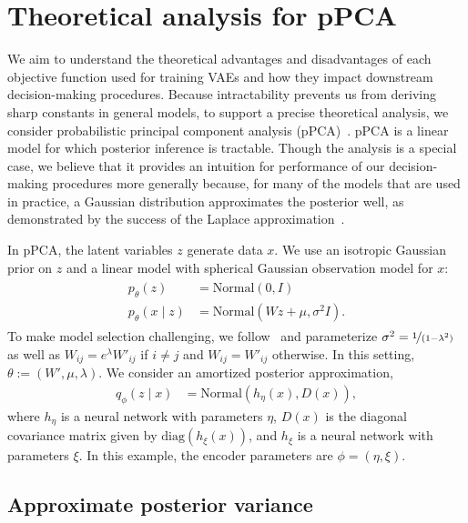 

\section{Theoretical analysis for pPCA}
\label{sec:lin_VAE_analysis}
We aim to understand the theoretical advantages and disadvantages of each objective function used for training VAEs and how they impact downstream decision-making procedures.
Because intractability prevents us from deriving sharp constants in general models, to support a precise theoretical analysis, we consider probabilistic principal component analysis (pPCA)~\cite{tipping1999probabilistic}. pPCA is a linear model for which posterior inference is tractable. 
Though the analysis is a special case, we believe that it provides an intuition for performance of our decision-making procedures more generally because, for many of the models that are used in practice, a Gaussian distribution approximates the posterior well, as demonstrated by the success of the Laplace approximation~\cite{laplace1986}.

In pPCA, the latent variables $z$ generate data $x$. We use an isotropic Gaussian prior on $z$ and a linear model with spherical Gaussian observation model for $x$:
\begin{align}
\label{eq:lin_vae_gen}
\begin{split}
p_\theta(z) &=\textrm{Normal}(0, I) \\
p_\theta(x \mid z) &= \textrm{Normal}(Wz + \mu, \sigma^2I).
\end{split}
\end{align}
To make model selection challenging, we follow~\cite{Turner2011} and parameterize $\sigma^2 = \nicefrac{1}{(1 - \lambda^2)}$ as well as $W_{ij} = e^\lambda W'_{ij}$ if $i \neq j$ and $W_{ij} = W'_{ij}$ otherwise. In this setting, $\theta := (W', \mu, \lambda)$. We consider an amortized posterior approximation,
\begin{align}
\label{eq:lin_vae_inf}
q_\phi(z \mid x) &= \textrm{Normal}\left(h_\eta(x), D(x)\right),
\end{align}
where $h_\eta$ is a neural network with parameters $\eta$, $D(x)$ is the diagonal covariance matrix given by $\mathrm{diag}(h_\xi(x))$, and $h_\xi$ is a neural network with parameters $\xi$. In this example, the encoder parameters are $\phi = (\eta, \xi)$.

\subsection{Approximate posterior variance}
 

